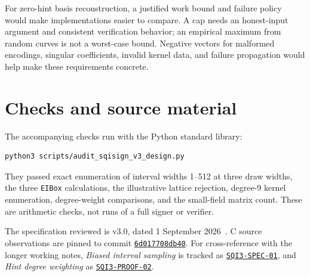 \documentclass[a4paper,11pt]{article}
\newcommand{\code}[1]{\texttt{#1}}
\begin{document}
For zero-hint basis reconstruction, a justified work bound and failure
policy would make implementations easier to compare. A cap needs an
honest-input argument and consistent verification behavior; an empirical
maximum from random curves is not a worst-case bound. Negative vectors
for malformed encodings, singular coefficients, invalid kernel data, and
failure propagation would help make these requirements concrete.

\section{Checks and source material}
\label{sec:checks}

The accompanying checks run with the Python standard library:
\begin{Verbatim}[fontsize=\small,frame=single,framesep=3mm]
python3 scripts/audit_sqisign_v3_design.py
\end{Verbatim}
They passed exact enumeration of interval widths 1--512 at three draw
widths, the three \code{EIBox} calculations, the illustrative lattice
rejection, degree-9 kernel enumeration, degree-weight comparisons, and the
small-field matrix count. These
are arithmetic checks, not runs of a full signer or verifier.

The specification reviewed is v3.0, dated 1 September 2026~\cite{spec}.
C source observations are pinned to commit
\href{https://github.com/SQISign/the-sqisign/tree/6d017708db403bf83977fa70770fc4f7f9e9ff21}{\code{6d017708db40}}.
For cross-reference with the longer working notes, \emph{Biased interval
sampling} is tracked as \hyperlink{SQI3-SPEC-01}{\code{SQI3-SPEC-01}},
and \emph{Hint degree weighting} as
\hyperlink{SQI3-PROOF-02}{\code{SQI3-PROOF-02}}.
\end{document}
